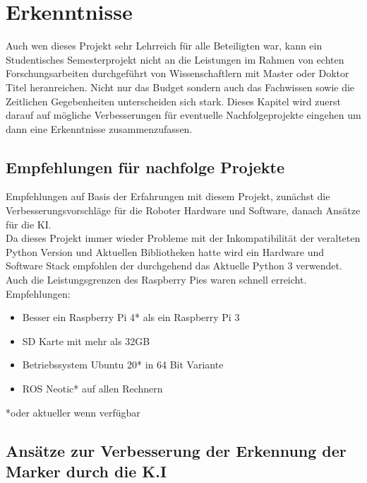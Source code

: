 \documentclass[conference]{IEEEtran}
\begin{document}

\section{Erkenntnisse 
}
Auch wen dieses Projekt sehr Lehrreich für alle Beteiligten war, kann ein Studentisches Semesterprojekt nicht an die Leistungen im Rahmen von echten Forschungsarbeiten durchgeführt von Wissenschaftlern mit Master oder Doktor Titel  heranreichen. Nicht nur das Budget sondern auch das Fachwissen sowie die Zeitlichen Gegebenheiten  unterscheiden sich stark. Dieses Kapitel wird zuerst darauf auf mögliche Verbesserungen für eventuelle Nachfolgeprojekte eingehen um dann eine Erkenntnisse zusammenzufassen. 

\subsection{Empfehlungen für nachfolge Projekte}

Empfehlungen auf Basis der Erfahrungen mit diesem Projekt, zunächst die Verbesserungsvorschläge für die Roboter Hardware und Software, danach Ansätze für die KI.\\
Da dieses Projekt immer wieder Probleme mit der Inkompatibilität der veralteten Python Version und Aktuellen Bibliotheken hatte wird ein Hardware und Software Stack empfohlen der durchgehend das Aktuelle Python 3 verwendet. Auch die Leistungsgrenzen des Raspberry Pies waren schnell erreicht. \\

Empfehlungen:
\begin{itemize}
	\item  Besser ein Raspberry Pi 4* als ein Raspberry Pi 3
	\item  SD Karte mit mehr als 32GB
	\item Betriebssystem Ubuntu 20* in 64 Bit Variante
	\item  ROS Neotic* auf allen Rechnern
\end{itemize}
*oder aktueller wenn verfügbar
\subsection{Ansätze zur Verbesserung der Erkennung der Marker durch die K.I}
\end{document}
